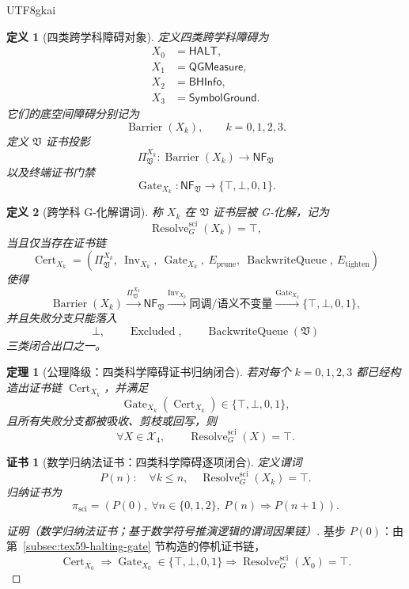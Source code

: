 \documentclass[12pt]{article}
\newtheorem{definition}{定义}[section]
\newtheorem{theorem}{定理}[section]
\newtheorem{Certificate}{证书}[section]
\newcommand{\Vsys}{\mathfrak V}
\newcommand{\NF}{\mathsf{NF}}
\DeclareMathOperator{\Cert}{Cert}
\DeclareMathOperator{\Resolve}{Resolve}
\DeclareMathOperator{\Barrier}{Barrier}
\DeclareMathOperator{\Gate}{Gate}
\DeclareMathOperator{\Inv}{Inv}
\DeclareMathOperator{\BackwriteQueue}{BackwriteQueue}
\DeclareMathOperator{\Excluded}{Excluded}
\begin{document}
\begin{CJK*}{UTF8}{gkai}
\begin{definition}[四类跨学科障碍对象]
\label{def:tex59-cross-objects}
定义四类跨学科障碍为
\[
\begin{aligned}
  X_0&=\mathsf{HALT},\\
  X_1&=\mathsf{QGMeasure},\\
  X_2&=\mathsf{BHInfo},\\
  X_3&=\mathsf{SymbolGround}.
\end{aligned}
\]
它们的底空间障碍分别记为
\[
  \Barrier(X_k),\qquad k=0,1,2,3.
\]
定义 \(\Vsys\) 证书投影
\[
  \Pi_{\Vsys}^{X_k}:\Barrier(X_k)\longrightarrow\NF_{\Vsys}
\]
以及终端证书门禁
\[
  \Gate_{X_k}:\NF_{\Vsys}\longrightarrow\{\top,\bot,0,1\}.
\]
\end{definition}

\begin{definition}[跨学科 G-化解谓词]
\label{def:tex59-cross-resolution}
称 \(X_k\) 在 \(\Vsys\) 证书层被 G-化解，记为
\[
  \Resolve_G^{\mathrm{sci}}(X_k)=\top,
\]
当且仅当存在证书链
\[
  \Cert_{X_k}
  =
  \left(
    \Pi_{\Vsys}^{X_k},\
    \Inv_{X_k},\
    \Gate_{X_k},\
    E_{\mathrm{prune}},\
    \BackwriteQueue,\
    E_{\mathrm{tighten}}
  \right)
\]
使得
\[
  \Barrier(X_k)
  \xrightarrow{\Pi_{\Vsys}^{X_k}}
  \NF_{\Vsys}
  \xrightarrow{\Inv_{X_k}}
  \text{同调/语义不变量}
  \xrightarrow{\Gate_{X_k}}
  \{\top,\bot,0,1\},
\]
并且失败分支只能落入
\[
  \bot,\qquad \Excluded,\qquad \BackwriteQueue(\Vsys)
\]
三类闭合出口之一。
\end{definition}

\begin{theorem}[公理降级：四类科学障碍证书归纳闭合]
\label{thm:tex59-cross-induction}
若对每个 \(k=0,1,2,3\) 都已经构造出证书链 \(\Cert_{X_k}\)，并满足
\[
  \Gate_{X_k}(\Cert_{X_k})\in\{\top,\bot,0,1\},
\]
且所有失败分支都被吸收、剪枝或回写，则
\[
  \forall X\in\mathcal X_4,\qquad
  \Resolve_G^{\mathrm{sci}}(X)=\top.
\]
\end{theorem}

\begin{Certificate}[数学归纳法证书：四类科学障碍逐项闭合]
\label{cert:tex59-cross-induction}
定义谓词
\[
  P(n):
  \quad
  \forall k\le n,\quad
  \Resolve_G^{\mathrm{sci}}(X_k)=\top.
\]
归纳证书为
\[
  \pi_{\mathrm{sci}}
  =
  \left(
    P(0),\
    \forall n\in\{0,1,2\},\ P(n)\Rightarrow P(n+1)
  \right).
\]
\end{Certificate}

\begin{proof}[证明（数学归纳法证书；基于数学符号推演逻辑的谓词因果链）]
基步 \(P(0)\)：由第~\ref{subsec:tex59-halting-gate} 节构造的停机证书链，
\[
  \Cert_{X_0}
  \Rightarrow
  \Gate_{X_0}\in\{\top,\bot,0,1\}
  \Rightarrow
  \Resolve_G^{\mathrm{sci}}(X_0)=\top.
\]


\end{proof}
\end{CJK*}
\end{document}
